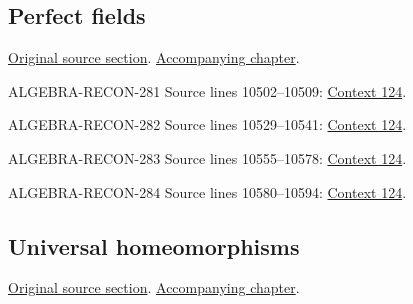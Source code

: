 \subsection{Perfect fields}
\hypertarget{algebra-source-section-perfect-fields}{}
\noindent\href{https://github.com/stacks/stacks-project/blob/a04446e57ec1fbc252a871afcec7752fb2807b14/algebra.tex\#L10482}{Original source section}. \href{algebra.pdf\#nameddest=section-perfect-fields}{Accompanying chapter}.

\begin{AlgebraSourceRoutes}
\item[ALGEBRA-RECON-281] Source lines 10502--10509: \hyperlink{algebra-context-124}{Context 124}.
\item[ALGEBRA-RECON-282] Source lines 10529--10541: \hyperlink{algebra-context-124}{Context 124}.
\item[ALGEBRA-RECON-283] Source lines 10555--10578: \hyperlink{algebra-context-124}{Context 124}.
\item[ALGEBRA-RECON-284] Source lines 10580--10594: \hyperlink{algebra-context-124}{Context 124}.
\end{AlgebraSourceRoutes}

\subsection{Universal homeomorphisms}
\hypertarget{algebra-source-section-universal-homeomorphism}{}
\noindent\href{https://github.com/stacks/stacks-project/blob/a04446e57ec1fbc252a871afcec7752fb2807b14/algebra.tex\#L10604}{Original source section}. \href{algebra.pdf\#nameddest=section-universal-homeomorphism}{Accompanying chapter}.


